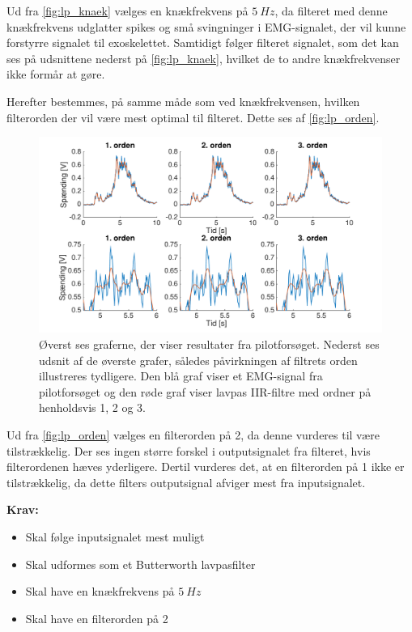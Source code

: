 \noindent
Ud fra \autoref{fig:lp_knaek} vælges en knækfrekvens på $5~Hz$, da filteret med denne knækfrekvens udglatter spikes og små svingninger i EMG-signalet, der vil kunne forstyrre signalet til exoskelettet. Samtidigt følger filteret signalet, som det kan ses på udsnittene nederst på \ref{fig:lp_knaek}, hvilket de to andre knækfrekvenser ikke formår at gøre.

Herefter bestemmes, på samme måde som ved knækfrekvensen, hvilken filterorden der vil være mest optimal til filteret. Dette ses af \autoref{fig:lp_orden}.

\begin{figure} [H]
\centering
\includegraphics[width=1.0\textwidth]{figures/problemloesning/lavpas_orden.pdf}
\caption{Øverst ses graferne, der viser resultater fra pilotforsøget. Nederst ses udsnit af de øverste grafer, således påvirkningen af filtrets orden illustreres tydligere. Den blå graf viser et EMG-signal fra pilotforsøget og den røde graf viser lavpas IIR-filtre med ordner på henholdsvis 1, 2 og 3.}
\label{fig:lp_orden}
\end{figure} 

\noindent
Ud fra \autoref{fig:lp_orden} vælges en filterorden på 2, da denne vurderes til være tilstrækkelig. Der ses ingen større forskel i outputsignalet fra filteret, hvis filterordenen hæves yderligere. Dertil vurderes det, at en filterorden på 1 ikke er tilstrækkelig, da dette filters outputsignal afviger mest fra inputsignalet. 

\vspace{3mm}

\textbf{Krav:}
\begin{itemize}
\item Skal følge inputsignalet mest muligt  
\item Skal udformes som et Butterworth lavpasfilter
\item Skal have en knækfrekvens på $5~Hz$
\item Skal have en filterorden på 2
\end{itemize}

